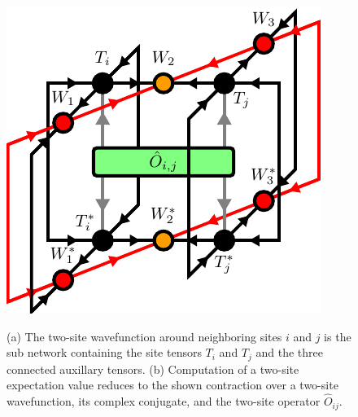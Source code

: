 \begin{figure}
	\centering
	\subcaptionbox{\label{fig:disoTPS_twosite_expectation_value_environment}}
	{%
		\usebox{\largestimage}
	}
	\quad\quad
	\subcaptionbox{\label{fig:disoTPS_twosite_expectation_value_computation}}
	{%
		\raisebox{\dimexpr.5\ht\largestimage-.5\height}
		{%
			\includegraphics[scale=1.0]{figures/tikz/disoTPS/two_site_expectation_value/two_site_expectation_value_b.pdf}
		}
	}
	\caption{(a) The two-site wavefunction around neighboring sites $i$ and $j$ is the sub network containing the site tensors $T_i$ and $T_j$ and the three connected auxillary tensors. (b) Computation of a two-site expectation value reduces to the shown contraction over a two-site wavefunction, its complex conjugate, and the two-site operator $\hat{O}_{ij}$.}
	\label{fig:disoTPS_twosite_expectation_value}
\end{figure}
